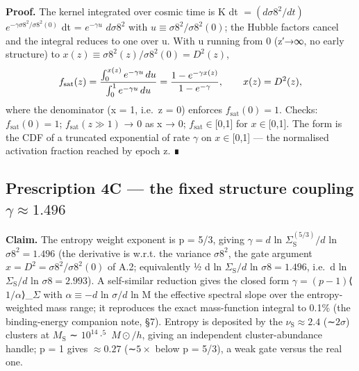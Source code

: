 \documentclass[preprint,12pt]{elsarticle}
\begin{document}
\textbf{Proof.} The kernel integrated over cosmic time is K dt
\(= (d\sigma 8^{2}/dt)\) \(e^{-\gamma \sigma 8^{2}/\sigma 8^{2}(0)}\) dt
= \(e^{-\gamma u}\) \(d\sigma 8^{2}\) with
\(u \equiv  \sigma 8^{2}/\sigma 8^{2}(0)\); the Hubble factors cancel
and the integral reduces to one over u. With u running from 0 (z′→∞, no
early structure) to
\(x(z) \equiv  \sigma 8^{2}(z)/\sigma 8^{2}(0) = D^{2}(z)\),
\begin{equation}f_{\rm sat}(z) = \frac{\int_0^{x(z)} e^{-\gamma u}\,du}{\int_0^{1} e^{-\gamma u}\,du}
= \frac{1 - e^{-\gamma x(z)}}{1 - e^{-\gamma}}, \qquad x(z) = D^2(z),\end{equation}
where the denominator (x = 1, i.e.~z = 0) enforces
\(f_{\mathrm{sat}}(0) = 1\). Checks: \(f_{\mathrm{sat}}(0) = 1\);
\(f_{\mathrm{sat}}(z \gg  1)\) → 0 as x → 0;
\(f_{\mathrm{sat}} \in  [0\),1{]} for \(x \in  [0\),1{]}. The form is
the CDF of a truncated exponential of rate \(\gamma\) on
\(x \in  [0\),1{]} --- the normalised activation fraction reached by
epoch z. ∎

\subsection{\texorpdfstring{Prescription 4C --- the fixed structure
coupling
\(\gamma  \approx  1.496\)}{Prescription 4C --- the fixed structure coupling \textbackslash gamma  \textbackslash approx  1.496}}\label{sec-A-3}

\textbf{Claim.} The entropy weight exponent is p = 5/3, giving
\(\gamma  = d\) ln \(\Sigma _{\mathrm{S}}^{(5/3)}/d\) ln
\(\sigma 8^{2} = 1.496\) (the derivative is w.r.t. the variance
\(\sigma 8^{2}\), the gate argument
\(x = D^{2} = \sigma 8^{2}/\sigma 8^{2}(0)\) of A.2; equivalently ½ d ln
\(\Sigma _{\mathrm{S}}/d\) ln \(\sigma 8 = 1.496\), i.e.~d ln
\(\Sigma _{\mathrm{S}}/d\) ln \(\sigma 8 = 2.993\)). A self-similar
reduction gives the closed form
\(\gamma  = (p-1)\)⟨\(1/\alpha\)⟩\_\(\Sigma\) with
\(\alpha  \equiv  -d\) ln \(\sigma /d\) ln M the effective spectral
slope over the entropy-weighted mass range; it reproduces the exact
mass-function integral to 0.1\% (the binding-energy companion note, §7).
Entropy is deposited by the \(\nu _{\mathrm{S}} \approx  2.4\)
(∼\(2\sigma\)) clusters at \(M_{\mathrm{S}}\) ∼ \(10^{14}\cdot ^{5}\)
\(M\odot /h\), giving an independent cluster-abundance handle; p = 1
gives \(\approx  0.27\) (∼\(5\times\) below p = 5/3), a weak gate versus
the real one.
\end{document}
